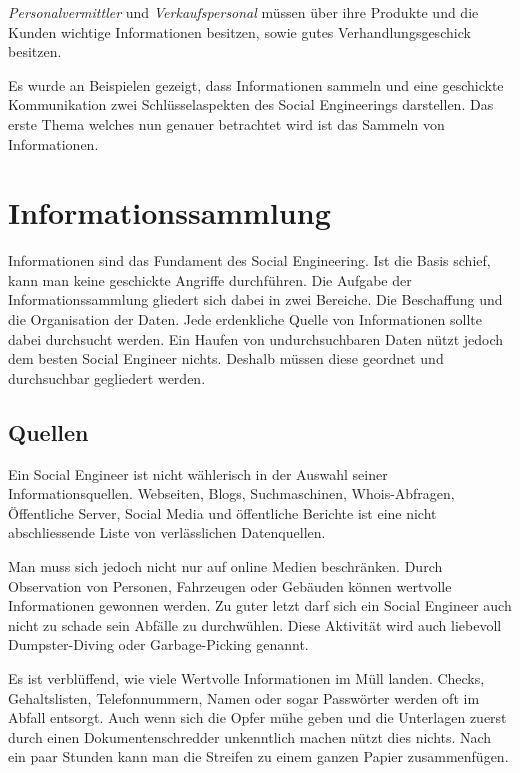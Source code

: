 \textit{Personalvermittler} und \textit{Verkaufspersonal} müssen über ihre Produkte und die Kunden wichtige Informationen besitzen, sowie gutes Verhandlungsgeschick besitzen.

Es wurde an Beispielen gezeigt, dass Informationen sammeln und eine geschickte Kommunikation zwei Schlüsselaspekten des Social Engineerings darstellen. Das erste Thema welches nun genauer betrachtet wird ist das Sammeln von Informationen.

\section{Informationssammlung}
Informationen sind das Fundament des Social Engineering. Ist die Basis schief, kann man keine geschickte Angriffe durchführen. Die Aufgabe der Informationssammlung gliedert sich dabei in zwei Bereiche. Die Beschaffung und die Organisation der Daten. Jede erdenkliche Quelle von Informationen sollte dabei durchsucht werden. Ein Haufen von undurchsuchbaren Daten nützt jedoch dem besten Social Engineer nichts. Deshalb müssen diese geordnet und durchsuchbar gegliedert werden.

\subsection{Quellen}
Ein Social Engineer ist nicht wählerisch in der Auswahl seiner Informationsquellen. Webseiten, Blogs, Suchmaschinen, Whois-Abfragen, Öffentliche Server, Social Media und öffentliche Berichte ist eine nicht abschliessende Liste von verlässlichen Datenquellen. 

Man muss sich jedoch nicht nur auf online Medien beschränken. Durch Observation von Personen, Fahrzeugen oder Gebäuden können wertvolle Informationen gewonnen werden. Zu guter letzt darf sich ein Social Engineer auch nicht zu schade sein Abfälle zu durchwühlen. Diese Aktivität wird auch liebevoll Dumpster-Diving oder Garbage-Picking genannt. 

Es ist verblüffend, wie viele Wertvolle Informationen im Müll landen. Checks, Gehaltslisten, Telefonnummern, Namen oder sogar Passwörter werden oft im Abfall entsorgt. Auch wenn sich die Opfer mühe geben und die Unterlagen zuerst durch einen Dokumentenschredder unkenntlich machen nützt dies nichts. Nach ein paar Stunden kann man die Streifen zu einem ganzen Papier zusammenfügen. 

